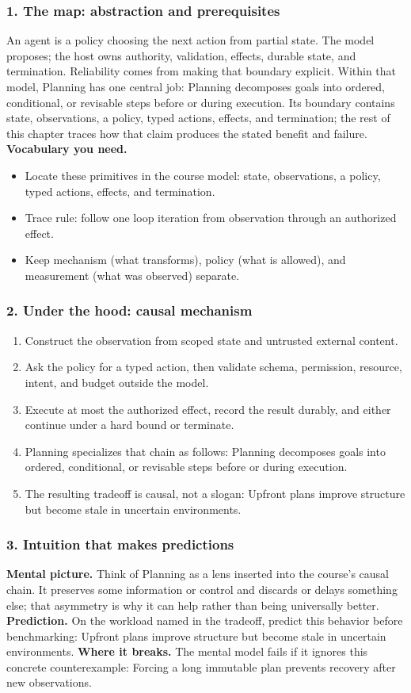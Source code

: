 \subsubsection*{1. The map: abstraction and prerequisites}
An agent is a policy choosing the next action from partial state. The model proposes; the host owns authority, validation, effects, durable state, and termination. Reliability comes from making that boundary explicit.
Within that model, Planning has one central job: Planning decomposes goals into ordered, conditional, or revisable steps before or during execution. Its boundary contains state, observations, a policy, typed actions, effects, and termination; the rest of this chapter traces how that claim produces the stated benefit and failure.
\textbf{Vocabulary you need.}\begin{itemize}
\item Locate these primitives in the course model: state, observations, a policy, typed actions, effects, and termination.
\item Trace rule: follow one loop iteration from observation through an authorized effect.
\item Keep mechanism (what transforms), policy (what is allowed), and measurement (what was observed) separate.
\end{itemize}
\subsubsection*{2. Under the hood: causal mechanism}\begin{enumerate}
\item Construct the observation from scoped state and untrusted external content.
\item Ask the policy for a typed action, then validate schema, permission, resource, intent, and budget outside the model.
\item Execute at most the authorized effect, record the result durably, and either continue under a hard bound or terminate.
\item Planning specializes that chain as follows: Planning decomposes goals into ordered, conditional, or revisable steps before or during execution.
\item The resulting tradeoff is causal, not a slogan: Upfront plans improve structure but become stale in uncertain environments.
\end{enumerate}
\subsubsection*{3. Intuition that makes predictions}
\textbf{Mental picture.} Think of Planning as a lens inserted into the course's causal chain. It preserves some information or control and discards or delays something else; that asymmetry is why it can help rather than being universally better.
\textbf{Prediction.} On the workload named in the tradeoff, predict this behavior before benchmarking: Upfront plans improve structure but become stale in uncertain environments.
\textbf{Where it breaks.} The mental model fails if it ignores this concrete counterexample: Forcing a long immutable plan prevents recovery after new observations.
